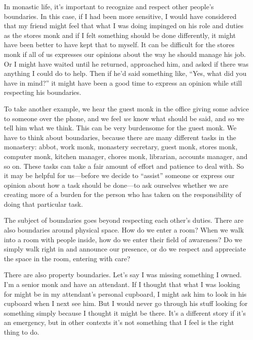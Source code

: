 In monastic life, it's important to recognize and respect other 
people's boundaries. In this case, if I had been more sensitive, I 
would have considered that my friend might feel that what I was doing 
impinged on his role and duties as the stores monk and if I felt 
something should be done differently, it might have been better to have 
kept that to myself. It can be difficult for the stores monk if all of 
us expresses our opinions about the way he should manage his job. Or I 
might have waited until he returned, approached him, and asked if there 
was anything I could do to help. Then if he'd said something like, 
``Yes, what did you have in mind?'' it might have been a good time to 
express an opinion while still respecting his boundaries.

To take another example, we hear the guest monk in the office giving 
some advice to someone over the phone, and we feel \emph{we} know what 
should be said, and so we tell him what we think. This can be very 
burdensome for the guest monk. We have to think about boundaries, 
because there are many different tasks in the monastery: abbot, work 
monk, monastery secretary, guest monk, stores monk, computer monk, 
kitchen manager, chores monk, librarian, accounts manager, and so on. 
These tasks can take a fair amount of effort and patience to deal with. 
So it may be helpful for us---before we decide to ``assist'' someone or 
express our opinion about how a task should be done---to ask ourselves 
whether we are creating more of a burden for the person who has taken 
on the responsibility of doing that particular task.

The subject of boundaries goes beyond respecting each other's duties. 
There are also boundaries around physical space. How do we enter a 
room? When we walk into a room with people inside, how do we enter 
their field of awareness? Do we simply walk right in and announce our 
presence, or do we respect and appreciate the space in the room, 
entering with care?

There are also property boundaries. Let's say I was missing something I 
owned. I'm a senior monk and have an attendant. If I thought that what 
I was looking for might be in my attendant's personal cupboard, I might 
ask him to look in his cupboard when I next see him. But I would never 
go through his stuff looking for something simply because I thought it 
might be there. It's a different story if it's an emergency, but in 
other contexts it's not something that I feel is the right thing to do.

